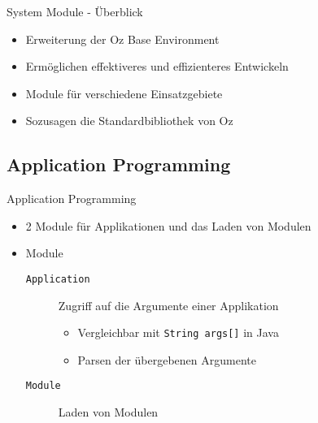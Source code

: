\begin{frame}{System Module - Überblick} 
  \begin{itemize}
    \item Erweiterung der Oz Base Environment
    \item Ermöglichen effektiveres und effizienteres Entwickeln
    \item Module für verschiedene Einsatzgebiete
    \item Sozusagen die Standardbibliothek von Oz
  \end{itemize}
\end{frame}
 
\subsection{Application Programming} 
\begin{frame}{Application Programming}
  \begin{itemize} 
    \item 2 Module für Applikationen und das Laden von Modulen
    \item Module
    \begin{description}
      \item[\texttt{Application}] Zugriff auf die Argumente einer
      Applikation
      \begin{itemize} 
  	    \item Vergleichbar mit \texttt{String args[]} in Java
  	    \item Parsen der übergebenen Argumente
	  \end{itemize}
      \item[\texttt{Module}]Laden von Modulen
    \end{description}
  \end{itemize}
\end{frame}
 
